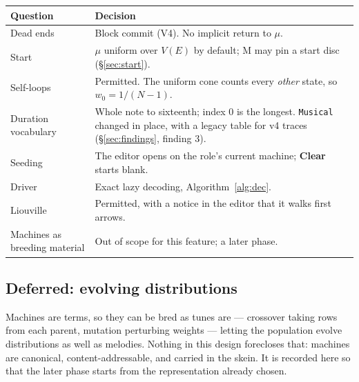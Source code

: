 \documentclass[11pt,a4paper]{article}
\theoremstyle{definition}
\theoremstyle{plain}
\theoremstyle{remark}
\begin{document}
\begin{center}
\begin{tabular}{>{\raggedright\arraybackslash}p{3.1cm}>{\raggedright\arraybackslash}p{9.6cm}}
\toprule
\textbf{Question} & \textbf{Decision} \\
\midrule
Dead ends & Block commit (V4). No implicit return to $\mu$. \\
Start & $\mu$ uniform over $V(E)$ by default; M may pin a start disc (\S\ref{sec:start}). \\
Self-loops & Permitted. The uniform cone counts every \emph{other} state, so $w_0=1/(N-1)$. \\
Duration vocabulary & Whole note to sixteenth; index 0 is the longest. \texttt{Musical} changed in
  place, with a legacy table for v4 traces (\S\ref{sec:findings}, finding 3). \\
Seeding & The editor opens on the role's current machine; \textbf{Clear} starts blank. \\
Driver & Exact lazy decoding, Algorithm~\ref{alg:dec}. \\
Liouville & Permitted, with a notice in the editor that it walks first arrows. \\
Machines as breeding material & Out of scope for this feature; a later phase. \\
\bottomrule
\end{tabular}
\end{center}

\subsection*{Deferred: evolving distributions}

Machines are terms, so they can be bred as tunes are --- crossover taking rows from each parent,
mutation perturbing weights --- letting the population evolve distributions as well as melodies.
Nothing in this design forecloses that: machines are canonical, content-addressable, and carried in
the skein. It is recorded here so that the later phase starts from the representation already
chosen.
\end{document}
